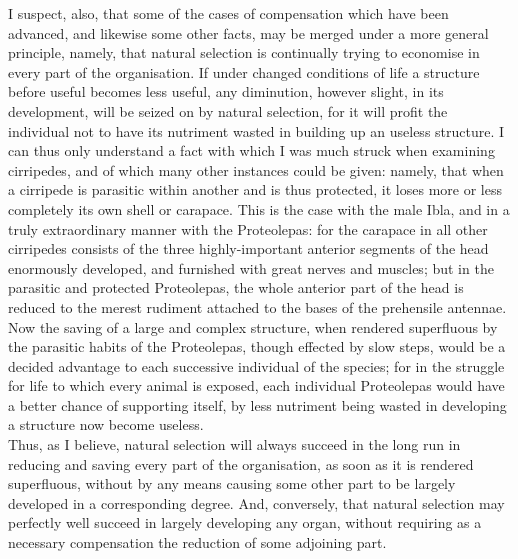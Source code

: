 \indent I suspect, also, that some of the cases of compensation which have been advanced, and likewise some other facts, may be merged under a more general principle, namely, that natural selection is continually trying to economise in every part of the organisation. If under changed conditions of life a structure before useful becomes less useful, any diminution, however slight, in its development, will be seized on by natural selection, for it will profit the individual not to have its nutriment wasted in building up an useless structure. I can thus only understand a fact with which I was much struck when examining cirripedes, and of which many other instances could be given: namely, that when a cirripede is parasitic within another and is thus protected, it loses more or less completely its own shell or carapace. This is the case with the male Ibla, and in a truly extraordinary manner with the Proteolepas: for the carapace in all other cirripedes consists of the three highly-important anterior segments of the head enormously developed, and furnished with great nerves and muscles; but in the parasitic and protected Proteolepas, the whole anterior part of the head is reduced to the merest rudiment attached to the bases of the prehensile antennae. Now the saving of a large and complex structure, when rendered superfluous by the parasitic habits of the Proteolepas, though effected by slow steps, would be a decided advantage to each successive individual of the species; for in the struggle for life to which every animal is exposed, each individual Proteolepas would have a better chance of supporting itself, by less nutriment being wasted in developing a structure now become useless.\\
\indent Thus, as I believe, natural selection will always succeed in the long run in reducing and saving every part of the organisation, as soon as it is rendered superfluous, without by any means causing some other part to be largely developed in a corresponding degree. And, conversely, that natural selection may perfectly well succeed in largely developing any organ, without requiring as a necessary compensation the reduction of some adjoining part.\\

